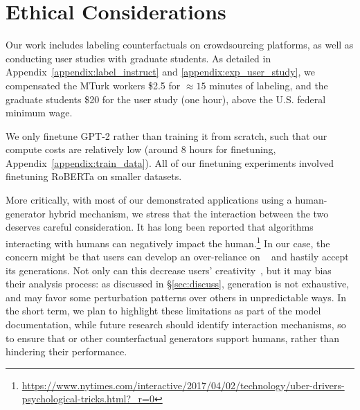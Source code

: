 
\section{Ethical Considerations}
Our work includes labeling counterfactuals on crowdsourcing platforms, as well as conducting user studies with graduate students.
As detailed in Appendix~\ref{appendix:label_instruct} and \ref{appendix:exp_user_study}, we compensated the MTurk workers \$2.5 for ${\approx}15$ minutes of labeling, and the graduate students \$20 for the user study (one hour), above the U.S. federal minimum wage.

We only finetune GPT-2 rather than training it from scratch, such that our compute costs are relatively low (around 8 hours for finetuning, Appendix~\ref{appendix:train_data}). All of our finetuning experiments involved finetuning RoBERTa on smaller datasets.

More critically, with most of our demonstrated applications using a human-generator hybrid mechanism, we stress that the interaction between the two deserves careful consideration.
It has long been reported that algorithms interacting with humans can negatively impact the human.\footnote{\url{https://www.nytimes.com/interactive/2017/04/02/technology/uber-drivers-psychological-tricks.html?_r=0}}
In our case, the concern might be that users can develop an over-reliance on \sysname~\cite{bansal2021does} and hastily accept its generations.
Not only can this decrease users' creativity~\cite{green-etal-2014-human}, but it may bias their analysis process: as discussed in \S\ref{sec:discuss}, \sysname generation is not exhaustive, and may favor some perturbation patterns over others in unpredictable ways.
In the short term, we plan to highlight these limitations as part of the model documentation, while future research should identify interaction mechanisms, so to ensure that \sysname or other counterfactual generators support humans, rather than hindering their performance.



